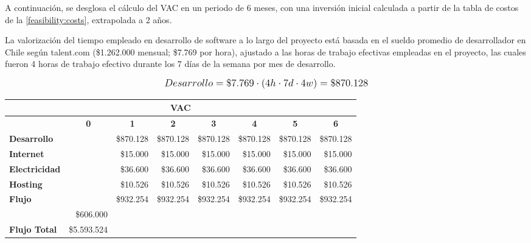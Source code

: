 A continuación, se desglosa el cálculo del VAC en un periodo de 6 meses, con una inversión inicial calculada a partir de la tabla de costos de la \autoref{feasibility:costs}, extrapolada a 2 años.

La valorización del tiempo empleado en desarrollo de software a lo largo del proyecto está basada en el sueldo promedio de desarrollador en Chile según talent.com (\$1.262.000 mensual; \$7.769 por hora), ajustado a las horas de trabajo efectivas empleadas en el proyecto, las cuales fueron 4 horas de trabajo efectivo durante los 7 días de la semana por mes de desarrollo.

\[
\mathlarger{
	Desarrollo = \$7.769 \cdot \left(4h\cdot7d\cdot4w\right) = \$870.128
}
\]


\begin{center}
	\begin{tabular}{ | l | l | l | l | l | l | l | l |}
		\hline
		\multicolumn{8}{|c|}{\textbf{VAC}} \\
		\hline
		 & \multicolumn{1}{|c|}{\textbf{0}} & \multicolumn{1}{|c|}{\textbf{1}} & \multicolumn{1}{|c|}{\textbf{2}} & \multicolumn{1}{|c|}{\textbf{3}} & \multicolumn{1}{|c|}{\textbf{4}} & \multicolumn{1}{|c|}{\textbf{5}} & \multicolumn{1}{|c|}{\textbf{6}} \\
		\hline
		{\textbf{Desarrollo}} &  & \multicolumn{1}{|r|}{\$870.128} & \multicolumn{1}{|r|}{\$870.128} & \multicolumn{1}{|r|}{\$870.128} & \multicolumn{1}{|r|}{\$870.128} & \multicolumn{1}{|r|}{\$870.128} & \multicolumn{1}{|r|}{\$870.128} \\ \hline
		
		{\textbf{Internet}} &  & \multicolumn{1}{|r|}{\$15.000} & \multicolumn{1}{|r|}{\$15.000} & \multicolumn{1}{|r|}{\$15.000} & \multicolumn{1}{|r|}{\$15.000} & \multicolumn{1}{|r|}{\$15.000} & \multicolumn{1}{|r|}{\$15.000} \\ \hline
		
		{\textbf{Electricidad}} &  & \multicolumn{1}{|r|}{\$36.600} & \multicolumn{1}{|r|}{\$36.600} & \multicolumn{1}{|r|}{\$36.600} & \multicolumn{1}{|r|}{\$36.600} & \multicolumn{1}{|r|}{\$36.600} & \multicolumn{1}{|r|}{\$36.600} \\ \hline
		
		{\textbf{Hosting}} &  & \multicolumn{1}{|r|}{\$10.526} & \multicolumn{1}{|r|}{\$10.526} & \multicolumn{1}{|r|}{\$10.526} & \multicolumn{1}{|r|}{\$10.526} & \multicolumn{1}{|r|}{\$10.526} & \multicolumn{1}{|r|}{\$10.526} \\ \hline
		
		{\textbf{Flujo}} &  & \multicolumn{1}{|r|}{\$932.254} & \multicolumn{1}{|r|}{\$932.254} & \multicolumn{1}{|r|}{\$932.254} & \multicolumn{1}{|r|}{\$932.254} & \multicolumn{1}{|r|}{\$932.254} & \multicolumn{1}{|r|}{\$932.254} \\ \hline
		& \multicolumn{1}{|r|}{\$606.000} & & & & & & \\ \hline
		\textbf{Flujo Total} & \multicolumn{1}{|r|}{\$5.593.524} & & & & & & \\ \hline
	\end{tabular}
\end{center}

